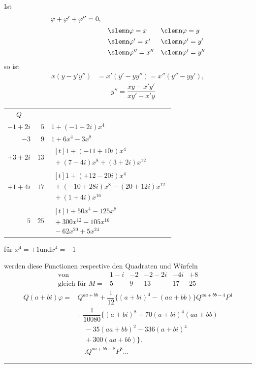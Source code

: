 Ist
\[
\begin{array}{rll}
\varphi+\varphi'+\varphi''=0,\\[5pt]&\slemn\varphi=x&\clemn\varphi=y\\[4pt]
&\slemn\varphi'=x'&\clemn\varphi'=y'\\[4pt]
&\slemn\varphi''=x''&\clemn\varphi'=y''
\end{array}
\]
so ist
\[
\begin{aligned}x(y-y'y'')&=x'(y'-yy'')=x''(y''-yy'),\\[7pt]&\qquad
y''=\dfrac{xy-x'y'}{xy'-x'y}\end{aligned}
\]
\begin{center}
\small
\begin{tabular}{r|r|l}
\multicolumn{1}{c}{$Q$}&\multicolumn{1}{c}{}&\multicolumn{1}{c}{}\\
$-1+2i$&$5$&$1+(-1+2i)x^4$\\[9pt]
$-3$&$9$&$1+6x^4-3x^8$\\[9pt]
$+3+2i$&$13$&$\begin{aligned}[t]1+(-11+10i)x^4\\[3pt]{}+(7-4i)x^8+(3+2i)x^{12}\end{aligned}$\\[9pt]
$+1+4i$&$17$&$\begin{aligned}[t]1+(+12-20i)x^4\\[3pt]{}+(-10+28i)x^8-(20+12i)x^{12}\\[3pt]{}+(1+4i)x^{16}\end{aligned}$\\[9pt]
$5$&$25$&$\begin{aligned}[t]1+50x^4-125x^8\\[3pt]{}+300x^{12}-105x^{16}\\[3pt]{}-62x^{20}+5x^{24}\end{aligned}$
\end{tabular}
\end{center}

für \hfill $x^4=+1$\quad und\quad $x^4=-1$\hfill\mbox{}

werden diese Functionen respective den Quadraten und Würfeln
\[
\begin{array}{rccccc}
\text{von}&1-i&-2&-2-2i&-4i&+8\\
\text{gleich für }M=&5&9&13&17&25
\end{array}
\]
\[
\begin{aligned}
Q(a+bi)\varphi={}&Q^{aa+bb}+\dfrac1{12}\{(a+bi)^4-(aa+bb)\}Q^{aa+bb-4}P^4\\[7pt]
&-\dfrac1{10080}\{(a+bi)^8+70(a+bi)^4(aa+bb)\\[5pt]&\quad{}-35(aa+bb)^2-336(a+bi)^4\\[5pt]&\quad{}+300(aa+bb)\}.\\[7pt]
&\quad.Q^{aa+bb-8}P^8\mathord{.}\mathord{.}\mathord{.}
\end{aligned}
\]
\par\begin{center}\rule{.22\linewidth}{.3pt}\end{center}
